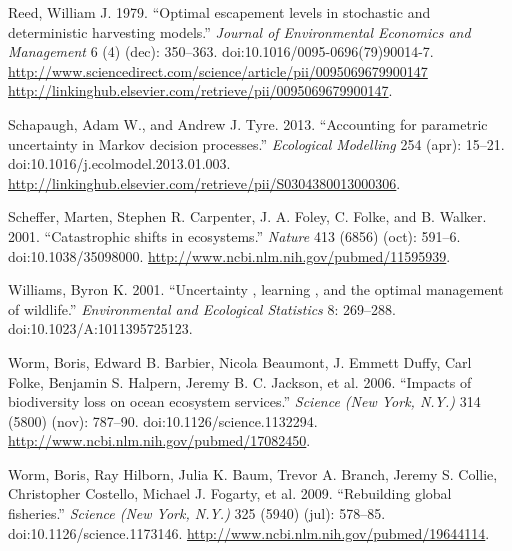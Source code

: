 \documentclass[author-year, review]{elsarticle} %
\begin{document}
Reed, William J. 1979. ``Optimal escapement levels in stochastic and
deterministic harvesting models.'' \emph{Journal of Environmental
Economics and Management} 6 (4) (dec): 350--363.
doi:10.1016/0095-0696(79)90014-7.
\href{http://www.sciencedirect.com/science/article/pii/0095069679900147 http://linkinghub.elsevier.com/retrieve/pii/0095069679900147}{http://www.sciencedirect.com/science/article/pii/0095069679900147
http://linkinghub.elsevier.com/retrieve/pii/0095069679900147}.

Schapaugh, Adam W., and Andrew J. Tyre. 2013. ``Accounting for
parametric uncertainty in Markov decision processes.'' \emph{Ecological
Modelling} 254 (apr): 15--21. doi:10.1016/j.ecolmodel.2013.01.003.
\url{http://linkinghub.elsevier.com/retrieve/pii/S0304380013000306}.

Scheffer, Marten, Stephen R. Carpenter, J. A. Foley, C. Folke, and B.
Walker. 2001. ``Catastrophic shifts in ecosystems.'' \emph{Nature} 413
(6856) (oct): 591--6. doi:10.1038/35098000.
\url{http://www.ncbi.nlm.nih.gov/pubmed/11595939}.

Williams, Byron K. 2001. ``Uncertainty , learning , and the optimal
management of wildlife.'' \emph{Environmental and Ecological Statistics}
8: 269--288. doi:10.1023/A:1011395725123.

Worm, Boris, Edward B. Barbier, Nicola Beaumont, J. Emmett Duffy, Carl
Folke, Benjamin S. Halpern, Jeremy B. C. Jackson, et al. 2006. ``Impacts
of biodiversity loss on ocean ecosystem services.'' \emph{Science (New
York, N.Y.)} 314 (5800) (nov): 787--90. doi:10.1126/science.1132294.
\url{http://www.ncbi.nlm.nih.gov/pubmed/17082450}.

Worm, Boris, Ray Hilborn, Julia K. Baum, Trevor A. Branch, Jeremy S.
Collie, Christopher Costello, Michael J. Fogarty, et al. 2009.
``Rebuilding global fisheries.'' \emph{Science (New York, N.Y.)} 325
(5940) (jul): 578--85. doi:10.1126/science.1173146.
\url{http://www.ncbi.nlm.nih.gov/pubmed/19644114}.
\end{document}
